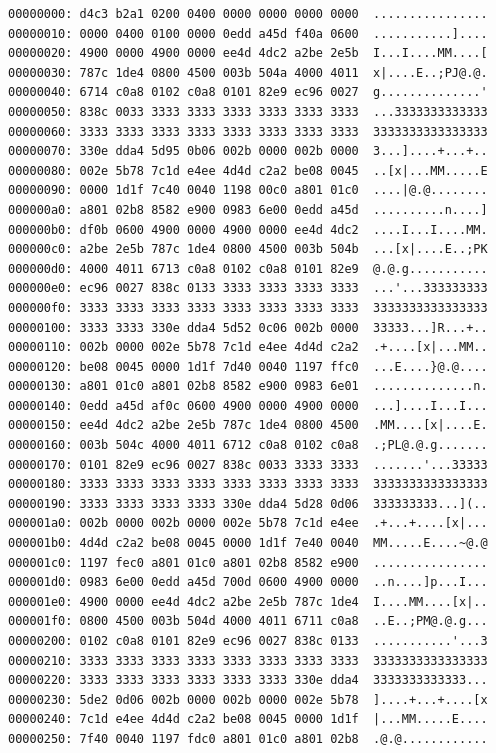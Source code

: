 \documentclass[paper=a4, fontsize=11pt]{scrartcl}
\numberwithin{equation}{section}		%
\numberwithin{figure}{section}			%
\numberwithin{table}{section}				%
\begin{document}
\begin{lstlisting}
00000000: d4c3 b2a1 0200 0400 0000 0000 0000 0000  ................
00000010: 0000 0400 0100 0000 0edd a45d f40a 0600  ...........]....
00000020: 4900 0000 4900 0000 ee4d 4dc2 a2be 2e5b  I...I....MM....[
00000030: 787c 1de4 0800 4500 003b 504a 4000 4011  x|....E..;PJ@.@.
00000040: 6714 c0a8 0102 c0a8 0101 82e9 ec96 0027  g..............'
00000050: 838c 0033 3333 3333 3333 3333 3333 3333  ...3333333333333
00000060: 3333 3333 3333 3333 3333 3333 3333 3333  3333333333333333
00000070: 330e dda4 5d95 0b06 002b 0000 002b 0000  3...]....+...+..
00000080: 002e 5b78 7c1d e4ee 4d4d c2a2 be08 0045  ..[x|...MM.....E
00000090: 0000 1d1f 7c40 0040 1198 00c0 a801 01c0  ....|@.@........
000000a0: a801 02b8 8582 e900 0983 6e00 0edd a45d  ..........n....]
000000b0: df0b 0600 4900 0000 4900 0000 ee4d 4dc2  ....I...I....MM.
000000c0: a2be 2e5b 787c 1de4 0800 4500 003b 504b  ...[x|....E..;PK
000000d0: 4000 4011 6713 c0a8 0102 c0a8 0101 82e9  @.@.g...........
000000e0: ec96 0027 838c 0133 3333 3333 3333 3333  ...'...333333333
000000f0: 3333 3333 3333 3333 3333 3333 3333 3333  3333333333333333
00000100: 3333 3333 330e dda4 5d52 0c06 002b 0000  33333...]R...+..
00000110: 002b 0000 002e 5b78 7c1d e4ee 4d4d c2a2  .+....[x|...MM..
00000120: be08 0045 0000 1d1f 7d40 0040 1197 ffc0  ...E....}@.@....
00000130: a801 01c0 a801 02b8 8582 e900 0983 6e01  ..............n.
00000140: 0edd a45d af0c 0600 4900 0000 4900 0000  ...]....I...I...
00000150: ee4d 4dc2 a2be 2e5b 787c 1de4 0800 4500  .MM....[x|....E.
00000160: 003b 504c 4000 4011 6712 c0a8 0102 c0a8  .;PL@.@.g.......
00000170: 0101 82e9 ec96 0027 838c 0033 3333 3333  .......'...33333
00000180: 3333 3333 3333 3333 3333 3333 3333 3333  3333333333333333
00000190: 3333 3333 3333 3333 330e dda4 5d28 0d06  333333333...](..
000001a0: 002b 0000 002b 0000 002e 5b78 7c1d e4ee  .+...+....[x|...
000001b0: 4d4d c2a2 be08 0045 0000 1d1f 7e40 0040  MM.....E....~@.@
000001c0: 1197 fec0 a801 01c0 a801 02b8 8582 e900  ................
000001d0: 0983 6e00 0edd a45d 700d 0600 4900 0000  ..n....]p...I...
000001e0: 4900 0000 ee4d 4dc2 a2be 2e5b 787c 1de4  I....MM....[x|..
000001f0: 0800 4500 003b 504d 4000 4011 6711 c0a8  ..E..;PM@.@.g...
00000200: 0102 c0a8 0101 82e9 ec96 0027 838c 0133  ...........'...3
00000210: 3333 3333 3333 3333 3333 3333 3333 3333  3333333333333333
00000220: 3333 3333 3333 3333 3333 3333 330e dda4  3333333333333...
00000230: 5de2 0d06 002b 0000 002b 0000 002e 5b78  ]....+...+....[x
00000240: 7c1d e4ee 4d4d c2a2 be08 0045 0000 1d1f  |...MM.....E....
00000250: 7f40 0040 1197 fdc0 a801 01c0 a801 02b8  .@.@............

\end{lstlisting}
\end{document}
